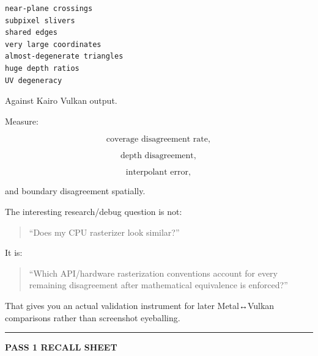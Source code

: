 \begin{verbatim}
near-plane crossings
subpixel slivers
shared edges
very large coordinates
almost-degenerate triangles
huge depth ratios
UV degeneracy
\end{verbatim}

Against Kairo Vulkan output.

Measure:

\[
\text{coverage disagreement rate},
\]

\[
\text{depth disagreement},
\]

\[
\text{interpolant error},
\]

and boundary disagreement spatially.

The interesting research/debug question is not:

\begin{quote}
``Does my CPU rasterizer look similar?''
\end{quote}

It is:

\begin{quote}
``Which API/hardware rasterization conventions account for every remaining disagreement after mathematical equivalence is enforced?''
\end{quote}

That gives you an actual validation instrument for later Metal↔Vulkan comparisons rather than screenshot eyeballing.

\begin{center}\rule{0.5\linewidth}{0.5pt}\end{center}

\textbf{PASS 1 RECALL SHEET}

